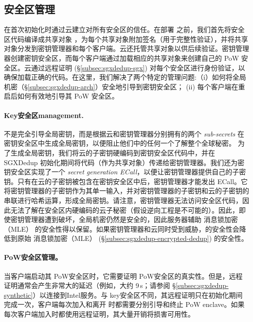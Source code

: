 \subsection{安全区管理}
\label{subsec:sgxdedup-enclave-management}

\sysnameS 在首次初始化时通过云建立对所有安全区的信任。在部署 \sysnameS 之前，我们首先将安全区代码编译成共享对象 \cite{sgx}，为每个共享对象附加签名（用于完整性验证），并将共享对象分发到密钥管理器和每个客户端。云还托管共享对象以供后续验证。密钥管理器创建密钥安全区，而每个客户端通过加载相应的共享对象来创建自己的 PoW 安全区。云通过远程证明 (\S\ref{subsec:sgxdedup-sgx}) 对每个安全区进行身份验证，以确保加载正确的代码。在这里，我们解决了两个特定的管理问题:（i）如何将全局机密（\S\ref{subsec:sgxdedup-arch}）安全地引导到密钥安全区； (ii) 每个客户端在重启后如何有效地引导其 PoW 安全区。

\paragraph*{Key安全区management.} \sysnameS 不是完全引导全局密钥，而是根据云和密钥管理器分别拥有的两个 \textit{ sub-secrets} 在密钥安全区中生成全局密钥，以便阻止他们中的任何一个了解整个全球秘密。
为了生成全局密钥，我们将云的子密钥硬编码到密钥安全区代码中，并在 SGXDedup 初始化期间将代码（作为共享对象）传递给密钥管理器。我们还为密钥安全区实现了一个\textit{ secret generation ECall}，以便让密钥管理器提供自己的子密钥。只有在云的子密钥被包含在密钥安全区中后，密钥管理器才能发出 ECall。它将密钥管理器的子密钥作为其单一输入，并对密钥管理器的子密钥和云的子密钥的串联进行哈希运算，形成全局密钥。请注意，密钥管理器无法访问安全区代码，因此无法了解在安全区内硬编码的云子秘密（假设逆向工程是不可能的）。因此，即使密钥管理器遭到破坏，全局机密仍然是安全的，因此服务器辅助 消息锁加密（MLE） 的安全性得以保留。如果密钥管理器和云同时受到威胁，\sysnameS 的安全性会降低到原始 消息锁加密（MLE） (\S\ref{subsec:sgxdedup-encrypted-dedup}) 的安全性。

\paragraph*{PoW安全区管理。} 当客户端启动其 PoW安全区时，它​​需要证明 PoW安全区的真实性。但是，远程证明通常会产生非常大的延迟（例如，大约 9\,s；请参阅 \S\ref{subsec:sgxdedup-synthetic}）以连接到Intel服务。与 key安全区不同，其远程证明只在初始化期间完成一次，客户端每次加入和离开 \sysnameS 时都需要分别引导和终止 PoW enclave。如果每次客户端加入时都使用远程证明，其大量开销将损害可用性。


